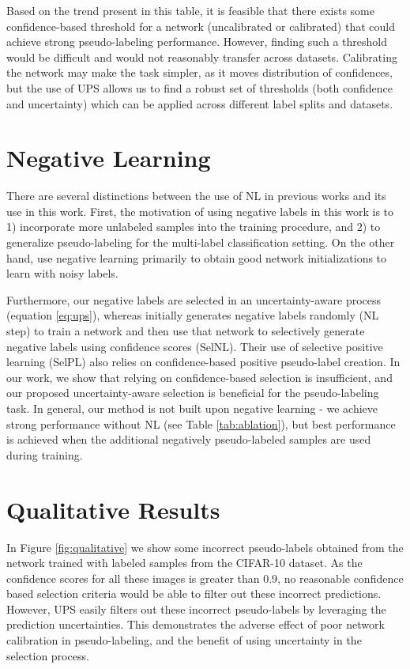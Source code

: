 \documentclass{article} \usepackage{iclr2021_conference,times}
\begin{document}
Based on the trend present in this table, it is feasible that there exists some confidence-based threshold for a network (uncalibrated or calibrated) that could achieve strong pseudo-labeling performance. However, finding such a threshold would be difficult and would not reasonably transfer across datasets. Calibrating the network may make the task simpler, as it moves distribution of confidences, but the use of UPS allows us to find a robust set of thresholds (both confidence and uncertainty) which can be applied across different label splits and datasets.





\section{Negative Learning}
\label{sec:nl}
There are several distinctions between the use of NL in previous works \citep{kim2019nlnl} and its use in this work. First, the motivation of using negative labels in this work is to 1) incorporate more unlabeled samples into the training procedure, and 2) to generalize pseudo-labeling for the multi-label classification setting. On the other hand, \cite{kim2019nlnl} use negative learning primarily to obtain good network initializations to learn with noisy labels.

Furthermore, our negative labels are selected in an uncertainty-aware process (equation \ref{eq:ups}), whereas \cite{kim2019nlnl} initially generates negative labels randomly (NL step) to train a network and then use that network to selectively generate negative labels using confidence scores (SelNL). Their use of selective positive learning (SelPL) also relies on confidence-based positive pseudo-label creation. In our work, we show that relying on confidence-based selection is insufficient, and our proposed uncertainty-aware selection is beneficial for the pseudo-labeling task. In general, our method is not built upon negative learning - we achieve strong performance without NL (see Table \ref{tab:ablation}), but best performance is achieved when the additional negatively pseudo-labeled samples are used during training.












\section{Qualitative Results}
\label{sec:qualitative}
In Figure  \ref{fig:qualitative} we show some incorrect pseudo-labels obtained from the network trained with  labeled samples from the CIFAR-10 dataset. As the confidence scores for all these images is greater than 0.9, no reasonable confidence based selection criteria would be able to filter out these incorrect predictions. However, UPS easily filters out these incorrect pseudo-labels by leveraging the prediction uncertainties. This demonstrates the adverse effect of poor network calibration in pseudo-labeling, and the benefit of using uncertainty in the selection process.  
\end{document}
